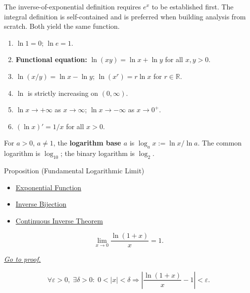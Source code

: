 \begin{remark*}
The inverse-of-exponential definition requires $e^x$ to be
established first. The integral definition is self-contained and
is preferred when building analysis from scratch. Both yield the
same function.
\end{remark*}

\begin{remark*}
\begin{enumerate}[label=(\roman*)]
  \item $\ln 1 = 0$;\; $\ln e = 1$.
  \item \textbf{Functional equation:} $\ln(xy) = \ln x + \ln y$
    for all $x, y > 0$.
  \item $\ln(x/y) = \ln x - \ln y$;\;
    $\ln(x^r) = r\ln x$ for $r \in \mathbb{R}$.
  \item $\ln$ is strictly increasing on $(0,\infty)$.
  \item $\ln x \to +\infty$ as $x \to \infty$;\;
    $\ln x \to -\infty$ as $x \to 0^+$.
  \item $(\ln x)' = 1/x$ for all $x > 0$.
\end{enumerate}
\end{remark*}

\begin{remark*}
For $a > 0$, $a \neq 1$, the \textbf{logarithm base $a$} is
$\log_a x := \ln x / \ln a$. The common logarithm is $\log_{10}$;
the binary logarithm is $\log_2$.
\end{remark*}


\begin{propositionbox}{Proposition (Fundamental Logarithmic Limit)}

\begin{dependencies}
\begin{itemize}
  \item \hyperref[def:exponential]{Exponential Function}
  \item \hyperref[prop:inverse-bijection]{Inverse Bijection}
  \item \hyperref[thm:continuous-inverse-theorem]{Continuous Inverse Theorem}
\end{itemize}
\end{dependencies}
\begin{proposition}
\label{prop:limit-logarithm-fundamental}
\[
  \lim_{x \to 0} \frac{\ln(1+x)}{x} = 1.
\]

\smallskip\noindent
\hyperref[prf:limit-logarithm-fundamental]{\textit{Go to proof.}}
\end{proposition}
\end{propositionbox}\begin{remark*}
\[
  \forall\varepsilon > 0,\;
  \exists\delta > 0 :\;
  0 < |x| < \delta \Rightarrow
  \left|\frac{\ln(1+x)}{x} - 1\right| < \varepsilon.
\]
\end{remark*}

